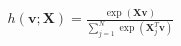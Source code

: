 \documentclass[preview]{standalone}
\begin{document}
\begin{align*}
h(\mathbf{v};\mathbf{X})=\frac{\exp(\mathbf{X}\mathbf{v})}{\sum_{j=1}^{N}\exp(\mathbf{X}_{j}^{T}\mathbf{v})}
\end{align*}
\end{document}
